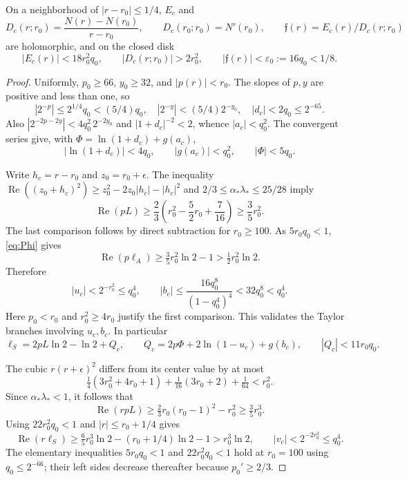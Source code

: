 \begin{lemma}\label{lem:disk}
On a neighborhood of $|r-r_0|\le1/4$, $E_c$ and
\[
 D_c(r;r_0)=\frac{N(r)-N(r_0)}{r-r_0},\qquad
 D_c(r_0;r_0)=N'(r_0),\qquad \mathfrak f(r)=E_c(r)/D_c(r;r_0)
\]
are holomorphic, and on the closed disk
\begin{equation}\label{eq:diskbounds}
 |E_c(r)|<18r_0^2q_0,\qquad |D_c(r;r_0)|>2r_0^2,\qquad
 |\mathfrak f(r)|<\varepsilon_0:=16q_0<1/8.
\end{equation}
\end{lemma}
\begin{proof}
Uniformly, $p_0\ge66$, $y_0\ge32$, and $|p(r)|<r_0$.
The slopes of $p,y$ are positive and less than one, so
\[
 |2^{-p}|\le2^{1/4}q_0<(5/4)q_0,\quad
 |2^{-y}|<(5/4)2^{-y_0},\quad |d_c|<2q_0\le2^{-65}.
\]
Also $|2^{-2p-2y}|<4q_0^2\,2^{-2y_0}$ and
$|1+d_c|^{-2}<2$, whence $|a_c|<q_0^2$.
The convergent series give, with $\Phi=\ln(1+d_c)+g(a_c)$,
\begin{equation}\label{eq:Phi}
 |\ln(1+d_c)|<4q_0,\qquad |g(a_c)|<q_0^2,\qquad
 |\Phi|<5q_0.
\end{equation}

Write $h_c=r-r_0$ and $z_0=r_0+\epsilon$. The inequality
$\operatorname{Re}((z_0+h_c)^2)\ge z_0^2-2z_0|h_c|-|h_c|^2$
and $2/3\le\alpha_*\lambda_*\le25/28$ imply
\[
 \operatorname{Re}(pL)\ge\frac23
 \left(r_0^2-\frac52r_0+\frac7{16}\right)\ge\frac35r_0^2.
\]
The last comparison follows by direct subtraction for $r_0\ge100$.
As $5r_0q_0<1$, \eqref{eq:Phi} gives
\[
 \operatorname{Re}(p\ell_A)\ge\tfrac35r_0^2\ln2-1
 >\tfrac12r_0^2\ln2.
\]
Therefore
\begin{equation}\label{eq:ubdisk}
 |u_c|<2^{-r_0^2}\le q_0^4,\qquad
 |b_c|\le\frac{16q_0^8}{(1-q_0^4)^4}<32q_0^8<q_0^4.
\end{equation}
Here $p_0<r_0$ and $r_0^2\ge4r_0$ justify the first comparison.
This validates the Taylor branches involving $u_c,b_c$. In particular
\[
 \ell_S=2pL\ln2-\ln2+Q_c,\qquad
 Q_c=2p\Phi+2\ln(1-u_c)+g(b_c),\qquad |Q_c|<11r_0q_0.
\]

The cubic $r(r+\epsilon)^2$ differs from its center value by at most
\[
 \tfrac14(3r_0^2+4r_0+1)+\tfrac1{16}(3r_0+2)+\tfrac1{64}<r_0^2.
\]
Since $\alpha_*\lambda_*<1$, it follows that
\[
 \operatorname{Re}(rpL)\ge\tfrac23r_0(r_0-1)^2-r_0^2
 \ge\tfrac35r_0^3.
\]
Using $22r_0^2q_0<1$ and $|r|\le r_0+1/4$ gives
\[
 \operatorname{Re}(r\ell_S)
 \ge\tfrac65r_0^3\ln2-(r_0+1/4)\ln2-1>r_0^3\ln2,
 \qquad |v_c|<2^{-2r_0^3}\le q_0^4.
\]
The elementary inequalities $5r_0q_0<1$ and $22r_0^2q_0<1$
hold at $r_0=100$ using $q_0\le2^{-66}$; their left sides
decrease thereafter because $p_0'\ge2/3$.


\end{proof}

